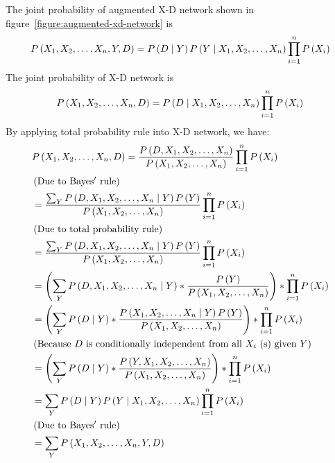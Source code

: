 \documentclass{article}
\numberwithin{equation}{section}
\numberwithin{figure}{section}
\numberwithin{table}{section}
\begin{document}
\noindent The joint probability of augmented X-D network shown in figure~\ref{figure:augmented-xd-network} is
\[P\left(X_1,X_2,\dots ,X_n,Y,D\right)=P\left(D\mathrel{\left|\vphantom{D Y}\right.\kern-\nulldelimiterspace}Y\right)P\left(Y\mathrel{\left|\vphantom{Y X_1,X_2,\dots ,X_n}\right.\kern-\nulldelimiterspace}X_1,X_2,\dots ,X_n\right)\prod^n_{i=1}{P\left(X_i\right)}\] 
The joint probability of X-D network is
\[P\left(X_1,X_2,\dots ,X_n,D\right)=P\left(D\mathrel{\left|\vphantom{D X_1,X_2,\dots ,X_n}\right.\kern-\nulldelimiterspace}X_1,X_2,\dots ,X_n\right)\prod^n_{i=1}{P\left(X_i\right)}\] 
By applying total probability rule into X-D network, we have:
\begin{align*}
&P\left(X_1,X_2,\dots ,X_n,D\right)=\frac{P\left(D,X_1,X_2,\dots ,X_n\right)}{P\left(X_1,X_2,\dots ,X_n\right)}\prod^n_{i=1}{P\left(X_i\right)}\\
&\left(\mathrm{Due}\ \mathrm{to}\ \mathrm{Bayes'}\ \mathrm{rule}\right)\\
&=\frac{\sum_Y{P\left(D,X_1,X_2,\dots ,X_n\mathrel{\left|\vphantom{D,X_1,X_2,\dots ,X_n Y}\right.\kern-\nulldelimiterspace}Y\right)P\left(Y\right)}}{P\left(X_1,X_2,\dots ,X_n\right)}\prod^n_{i=1}{P\left(X_i\right)}\\
&\left(\mathrm{Due}\ \mathrm{to}\ \mathrm{total}\ \mathrm{probability}\ \mathrm{rule}\right)\\
&=\frac{\sum_Y{P\left(D,X_1,X_2,\dots ,X_n\mathrel{\left|\vphantom{D,X_1,X_2,\dots ,X_n Y}\right.\kern-\nulldelimiterspace}Y\right)P\left(Y\right)}}{P\left(X_1,X_2,\dots ,X_n\right)}\prod^n_{i=1}{P\left(X_i\right)}\\
&=\left(\sum_Y{P\left(D,X_1,X_2,\dots ,X_n\mathrel{\left|\vphantom{D,X_1,X_2,\dots ,X_n Y}\right.\kern-\nulldelimiterspace}Y\right)*\frac{P\left(Y\right)}{P\left(X_1,X_2,\dots ,X_n\right)}}\right)*\prod^n_{i=1}{P\left(X_i\right)}\\
&=\left(\sum_Y{P\left(D\mathrel{\left|\vphantom{D Y}\right.\kern-\nulldelimiterspace}Y\right)*\frac{P\left(X_1,X_2,\dots ,X_n\mathrel{\left|\vphantom{X_1,X_2,\dots ,X_n Y}\right.\kern-\nulldelimiterspace}Y\right)P\left(Y\right)}{P\left(X_1,X_2,\dots ,X_n\right)}}\right)*\prod^n_{i=1}{P\left(X_i\right)}\\
&\left(\mathrm{Because}\ D\ \mathrm{is}\ \mathrm{conditionally}\ \mathrm{independent}\ \mathrm{from}\ \mathrm{all}\ X_i\ \mathrm{(s)}\ \mathrm{given}\ Y\right)\\
&=\left(\sum_Y{P\left(D\mathrel{\left|\vphantom{D Y}\right.\kern-\nulldelimiterspace}Y\right)*\frac{P\left(Y,X_1,X_2,\dots ,X_n\right)}{P\left(X_1,X_2,\dots ,X_n\right)}}\right)*\prod^n_{i=1}{P\left(X_i\right)}\\
&=\sum_Y{P\left(D\mathrel{\left|\vphantom{D Y}\right.\kern-\nulldelimiterspace}Y\right)P\left(Y\mathrel{\left|\vphantom{Y X_1,X_2,\dots ,X_n}\right.\kern-\nulldelimiterspace}X_1,X_2,\dots ,X_n\right)\prod^n_{i=1}{P\left(X_i\right)}}\\
&\left(\mathrm{Due}\ \mathrm{to}\ \mathrm{Bayes'}\ \mathrm{rule}\right)\\
&=\sum_Y{P\left(X_1,X_2,\dots ,X_n,Y,D\right)}
\end{align*}
\end{document}
